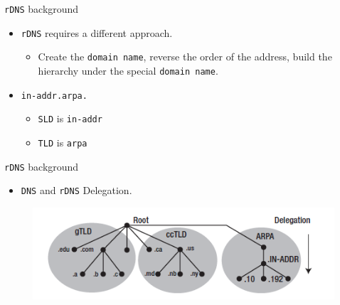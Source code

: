 \documentclass[xcolor=table,aspectratio=169]{beamer}
\begin{document}
\begin{frame}{\texttt{rDNS} background}
  \begin{itemize}
    \item \texttt{rDNS} requires a different approach.
      \begin{itemize}
        \item Create the \texttt{domain name}, reverse the order of the address, build the hierarchy under the special \texttt{domain name}.
      \end{itemize}
    \item \texttt{in-addr.arpa.}
      \begin{itemize}
        \item \texttt{SLD} is \texttt{in-addr}
        \item \texttt{TLD} is \texttt{arpa}
      \end{itemize}
  \end{itemize}
\end{frame}

\begin{frame}{\texttt{rDNS} background}
  \begin{itemize}
    \item \texttt{DNS} and \texttt{rDNS} Delegation. 
  \end{itemize}
  \begin{figure}
    \begin{center}
      \includegraphics[width=1\linewidth]{Delegate.png}
    \end{center}
  \end{figure}
\end{frame}
\end{document}
